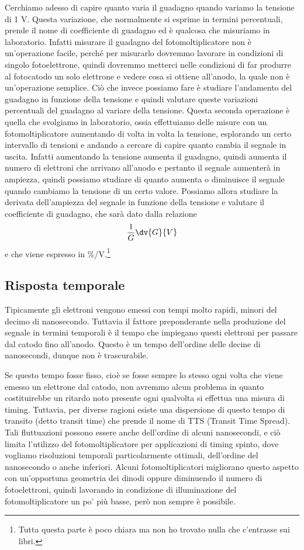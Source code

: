 \vspace{0.2cm}Cerchiamo adesso di capire quanto varia il guadagno quando variamo la tensione di 1 V. Questa variazione, che normalmente si esprime in termini percentuali, prende il nome di coefficiente di guadagno ed è qualcosa che misuriamo in laboratorio. Infatti misurare il guadagno del fotomoltiplicatore non è un'operazione facile, perché per misurarlo dovremmo lavorare in condizioni di singolo fotoelettrone, quindi dovremmo metterci nelle condizioni di far produrre al fotocatodo un solo elettrone e vedere cosa si ottiene all'anodo, la quale non è un'operazione semplice. Ciò che invece possiamo fare è studiare l'andamento del guadagno in funzione della tensione e quindi valutare queste variazioni percentuali del guadagno al variare della tensione. Questa seconda operazione è quella che svolgiamo in laboratorio, ossia effettuiamo delle misure con un fotomoltiplicatore aumentando di volta in volta la tensione, esplorando un certo intervallo di tensioni e andando a cercare di capire quanto cambia il segnale in uscita. Infatti aumentando la tensione aumenta il guadagno, quindi aumenta il numero di elettroni che arrivano all'anodo e pertanto il segnale aumenterà in ampiezza, quindi possiamo studiare di quanto aumenta o diminuisce il segnale quando cambiamo la tensione di un certo valore. Possiamo allora studiare la derivata dell'ampiezza del segnale in funzione della tensione e valutare il coefficiente di guadagno, che sarà dato dalla relazione
\begin{equation*}
   \frac{1}{G}\dv{G}{V}
\end{equation*}
e che viene espresso in \%/V.\footnote{Tutta questa parte è poco chiara ma non ho trovato nulla che c'entrasse sui libri.}

\subsection{Risposta temporale}
Tipicamente gli elettroni vengono emessi con tempi molto rapidi, minori del decimo di nanosecondo. Tuttavia il fattore preponderante nella produzione del segnale in termini temporali è il tempo che impiegano questi elettroni per passare dal catodo fino all'anodo. Questo è un tempo dell'ordine delle decine di nanosecondi, dunque non è trascurabile.

Se questo tempo fosse fisso, cioè se fosse sempre lo stesso ogni volta che viene emesso un elettrone dal catodo, non avremmo alcun problema in quanto costituirebbe un ritardo noto presente ogni qualvolta si effettua una misura di timing. Tuttavia, per diverse ragioni esiste una dispersione di questo tempo di transito (detto transit time) che prende il nome di TTS (Transit Time Spread). Tali fluttuazioni possono essere anche dell'ordine di alcuni nanosecondi, e ciò limita l'utilizzo del fotomoltiplicatore per applicazioni di timing spinto, dove vogliamo risoluzioni temporali particolarmente ottimali, dell'ordine del nanosecondo o anche inferiori. Alcuni fotomoltiplicatori migliorano questo aspetto con un'opportuna geometria dei dinodi oppure diminuendo il numero di fotoelettroni, quindi lavorando in condizione di illuminazione del fotomoltiplicatore un po' più basse, però non sempre è possibile.

